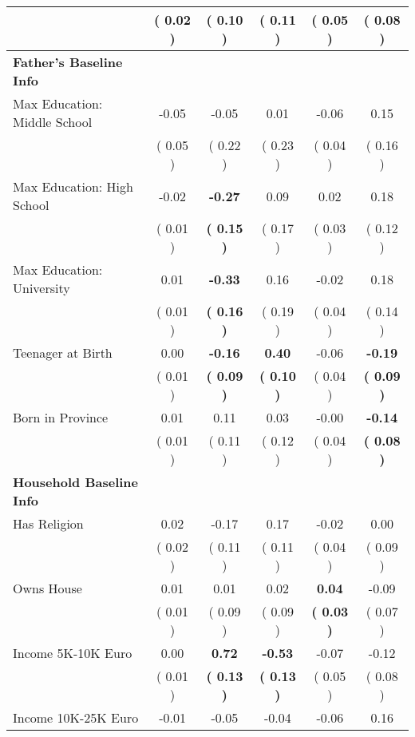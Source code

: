 \begin{table}[H]
{\begin{tabular}{lccccc}
\quad  & (     0.02 ) & (     0.10 )  & \textbf{(     0.11 )}  & (     0.05 ) & (     0.08 ) \\
\midrule
\textbf{Father's Baseline Info} \\
\quad Max Education: Middle School &     -0.05 &     -0.05 &      0.01 &     -0.06 &      0.15 \\
\quad  & (     0.05 ) & (     0.22 )  & (     0.23 )  & (     0.04 ) & (     0.16 ) \\
\quad Max Education: High School &     -0.02 & \textbf{    -0.27} &      0.09 &      0.02 &      0.18 \\
\quad  & (     0.01 ) & \textbf{(     0.15 )}  & (     0.17 )  & (     0.03 ) & (     0.12 ) \\
\quad Max Education: University &      0.01 & \textbf{    -0.33} &      0.16 &     -0.02 &      0.18 \\
\quad  & (     0.01 ) & \textbf{(     0.16 )}  & (     0.19 )  & (     0.04 ) & (     0.14 ) \\
\quad Teenager at Birth &      0.00 & \textbf{    -0.16} & \textbf{     0.40} &     -0.06 & \textbf{    -0.19} \\
\quad  & (     0.01 ) & \textbf{(     0.09 )}  & \textbf{(     0.10 )}  & (     0.04 ) & \textbf{(     0.09 )} \\
\quad Born in Province &      0.01 &      0.11 &      0.03 &     -0.00 & \textbf{    -0.14} \\
\quad  & (     0.01 ) & (     0.11 )  & (     0.12 )  & (     0.04 ) & \textbf{(     0.08 )} \\
\midrule
\textbf{Household Baseline Info} \\
\quad Has Religion &      0.02 &     -0.17 &      0.17 &     -0.02 &      0.00 \\
\quad  & (     0.02 ) & (     0.11 )  & (     0.11 )  & (     0.04 ) & (     0.09 ) \\
\quad Owns House &      0.01 &      0.01 &      0.02 & \textbf{     0.04} &     -0.09 \\
\quad  & (     0.01 ) & (     0.09 )  & (     0.09 )  & \textbf{(     0.03 )} & (     0.07 ) \\
\quad Income 5K-10K Euro &      0.00 & \textbf{     0.72} & \textbf{    -0.53} &     -0.07 &     -0.12 \\
\quad  & (     0.01 ) & \textbf{(     0.13 )}  & \textbf{(     0.13 )}  & (     0.05 ) & (     0.08 ) \\
\quad Income 10K-25K Euro &     -0.01 &     -0.05 &     -0.04 &     -0.06 &      0.16 \\

\end{tabular}}
\end{table}
